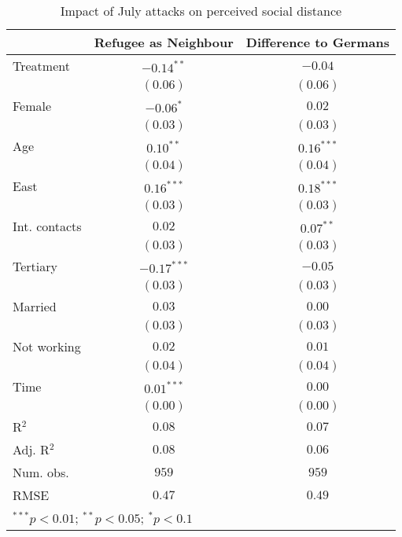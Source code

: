 
\begin{table}
\caption{Impact of July attacks on perceived social distance}
\begin{center}
\begin{tabular}{l c c}
\toprule
 & Refugee as Neighbour & Difference to Germans \\
\midrule
Treatment     & $-0.14^{**}$  & $-0.04$      \\
              & $(0.06)$      & $(0.06)$     \\
Female        & $-0.06^{*}$   & $0.02$       \\
              & $(0.03)$      & $(0.03)$     \\
Age           & $0.10^{**}$   & $0.16^{***}$ \\
              & $(0.04)$      & $(0.04)$     \\
East          & $0.16^{***}$  & $0.18^{***}$ \\
              & $(0.03)$      & $(0.03)$     \\
Int. contacts & $0.02$        & $0.07^{**}$  \\
              & $(0.03)$      & $(0.03)$     \\
Tertiary      & $-0.17^{***}$ & $-0.05$      \\
              & $(0.03)$      & $(0.03)$     \\
Married       & $0.03$        & $0.00$       \\
              & $(0.03)$      & $(0.03)$     \\
Not working   & $0.02$        & $0.01$       \\
              & $(0.04)$      & $(0.04)$     \\
Time          & $0.01^{***}$  & $0.00$       \\
              & $(0.00)$      & $(0.00)$     \\
\midrule
R$^2$         & $0.08$        & $0.07$       \\
Adj. R$^2$    & $0.08$        & $0.06$       \\
Num. obs.     & $959$         & $959$        \\
RMSE          & $0.47$        & $0.49$       \\
\bottomrule
\multicolumn{3}{l}{\scriptsize{$^{***}p<0.01$; $^{**}p<0.05$; $^{*}p<0.1$}}
\end{tabular}
\label{tab_dist}
\end{center}
\end{table}
